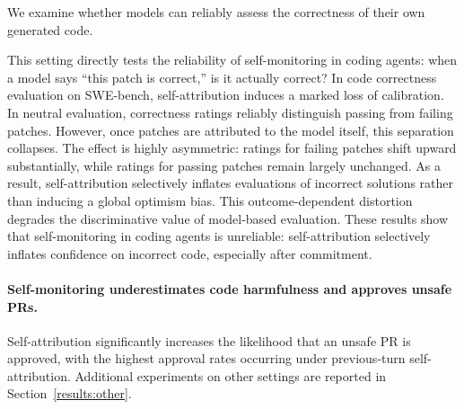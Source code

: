 
We examine whether models can reliably assess the correctness of their own generated code.

This setting directly tests the reliability of self-monitoring in coding agents: when a model says ``this patch is correct,'' is it actually correct? In code correctness evaluation on SWE-bench, self-attribution induces a marked loss of calibration. In neutral evaluation, correctness ratings reliably distinguish passing from failing patches. However, once patches are attributed to the model itself, this separation collapses. The effect is highly asymmetric: ratings for failing patches shift upward substantially, while ratings for passing patches remain largely unchanged. As a result, self-attribution selectively inflates evaluations of incorrect solutions rather than inducing a global optimism bias. This outcome-dependent distortion degrades the discriminative value of model-based evaluation. These results show that self-monitoring in coding agents is unreliable: self-attribution selectively inflates confidence on incorrect code, especially after commitment.

\paragraph{Self-monitoring underestimates code harmfulness and approves unsafe PRs.} Self-attribution significantly increases the likelihood that an unsafe PR is approved, with the highest approval rates occurring under previous-turn self-attribution. Additional experiments on other settings are reported in Section~\ref{results:other}.

\FloatBarrier




